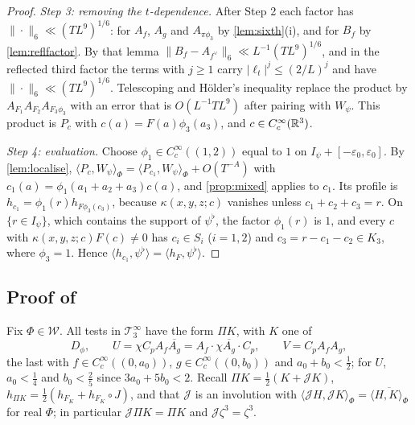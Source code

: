 \documentclass[11pt,colorlinks]{charlie}
\newcommand{\ip}[2]{\langle #1,#2\rangle}
\begin{document}
\begin{proof}
\emph{Step 3: removing the $t$-dependence.} After Step 2 each factor has $\|\cdot\|_6\ll(TL^9)^{1/6}$: for $A_f$, $A_g$ and $A_{\pi\phi_3}$ by \cref{lem:sixth}(i), and for $B_f$ by \cref{lem:reflfactor}. By that lemma $\|B_f-A_{f^\vee}\|_6\ll L^{-1}(TL^9)^{1/6}$, and in the reflected third factor the terms with $j\ge1$ carry $|\ell_t|^j\le(2/L)^j$ and have $\|\cdot\|_6\ll(TL^9)^{1/6}$. Telescoping and H\"older's inequality replace the product by $A_{F_1}A_{F_2}A_{F_3\phi_3}$ with an error that is $O(L^{-1}TL^9)$ after pairing with $W_\psi$. This product is $P_c$ with $c(a)=F(a)\phi_3(a_3)$, and $c\in C_c^\infty(\mathbb{R}^3)$.

\emph{Step 4: evaluation.} Choose $\phi_1\in C_c^\infty((1,2))$ equal to $1$ on $I_\psi+[-\varepsilon_0,\varepsilon_0]$. By \cref{lem:localise}, $\ip{P_c}{W_\psi}_\Phi=\ip{P_{c_1}}{W_\psi}_\Phi+O(T^{-A})$ with $c_1(a)=\phi_1(a_1+a_2+a_3)c(a)$, and \cref{prop:mixed} applies to $c_1$. Its profile is $h_{c_1}=\phi_1(r)h_{F\phi_3(c_3)}$, because $\kappa(x,y,z;c)$ vanishes unless $c_1+c_2+c_3=r$. On $\{r\in I_\psi\}$, which contains the support of $\psi^\flat$, the factor $\phi_1(r)$ is $1$, and every $c$ with $\kappa(x,y,z;c)F(c)\ne0$ has $c_i\in S_i$ ($i=1,2$) and $c_3=r-c_1-c_2\in K_3$, where $\phi_3=1$. Hence $\ip{h_{c_1}}{\psi^\flat}=\ip{h_F}{\psi^\flat}$.
\end{proof}

\subsection{Proof of }\label{sec:markedproof}
Fix $\Phi\in\mathcal W$. All tests in $\mathcal T_3^\infty$ have the form $\Pi K$, with $K$ one of
\[
 D_\phi,\qquad U=\chi C_pA_f\overline{A_g}=A_f\cdot\chi\overline{A_g}\cdot C_p,\qquad V=C_pA_fA_g ,
\]
the last with $f\in C_c^\infty((0,a_0))$, $g\in C_c^\infty((0,b_0))$ and $a_0+b_0<\frac12$; for $U$, $a_0<\frac14$ and $b_0<\frac25$ since $3a_0+5b_0<2$. Recall $\Pi K=\frac12(K+\mathcal JK)$, $h_{\Pi K}=\frac12(h_{F_K}+h_{F_K}\circ J)$, and that $\mathcal J$ is an involution with $\ip{\mathcal JH}{\mathcal JK}_\Phi=\overline{\ip HK_\Phi}$ for real $\Phi$; in particular $\mathcal J\Pi K=\Pi K$ and $\mathcal J\zeta^3=\zeta^3$.
\end{document}
